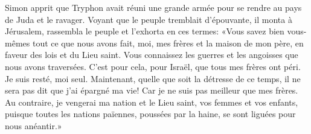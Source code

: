 Simon apprit que Tryphon avait réuni une grande armée
	pour se rendre au pays de Juda et le ravager.
Voyant que le peuple tremblait d’épouvante, il monta à Jérusalem,
	rassembla le peuple et l’exhorta en ces termes:
	«Vous savez bien vous-mêmes tout ce que nous avons fait,
	moi, mes frères et la maison de mon père,
	en faveur des lois et du Lieu saint.
Vous connaissez les guerres et les angoisses que nous avons traversées.
C’est pour cela, pour Israël, que tous mes frères ont péri.
	Je suis resté, moi seul.
Maintenant, quelle que soit la détresse de ce temps,
	il ne sera pas dit que j’ai épargné ma vie!
	Car je ne suis pas meilleur que mes frères.
Au contraire, je vengerai ma nation et le Lieu saint, vos femmes et vos enfants,
	puisque toutes les nations païennes, poussées par la haine,
	se sont liguées pour nous anéantir.»
